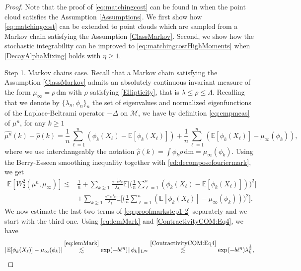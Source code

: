 \documentclass[11pt,a4paper,oneside]{amsart}
\numberwithin{equation}{section}
\newcommand{\dd}{\mathrm{d}}
\newcommand{\LL}{\mathrm{L}}
\newcommand{\m}{\mathrm{m}}
\begin{document}
\begin{proof}
Note that the proof of \eqref{eq:matchingcost} can be found in \cite[Theorem 2]{borda2021empirical} when the point cloud satisfies the Assumption \ref{Assumptions}. We first show how \eqref{eq:matchingcost} can be extended to point clouds which are sampled from a Markov chain satisfying the Assumption \ref{ClassMarkov}. Second, we show how the stochastic integrability can be improved to \eqref{eq:matchingcostHighMoments} when \eqref{DecayAlphaMixing} holds with $\eta \ge 1$.  

\medskip
{\sc Step 1. Markov chains case. }Recall that a Markov chain satisfying the Assumption \ref{ClassMarkov} admits an absolutely continuous invariant measure of the form $\mu_\infty= \rho\, \dd \m$ with $\rho$ satisfying \eqref{Ellipticity}, that is $\lambda\leq \rho\leq \Lambda$. Recalling that we denote by $\{\lambda_n,\phi_n\}_n$ the set of eigenvalues and normalized eigenfunctions of the Laplace-Beltrami operator $-\Delta$ on $\mathcal{M}$, we have by definition \eqref{eq:empmeas} of $\mu^n$, for any $k\geq 1$
%
\begin{equation}\label{ed:decomposefouriermark}
\widehat{\mu^n}(k) - \widehat{\rho}(k) = \frac1n \sum_{\ell=1}^n (\phi_k(X_\ell) - \mathbb{E}[\phi_k(X_\ell)]) + \frac1n \sum_{\ell=1}^n (\mathbb{E}[\phi_k(X_\ell)] - \mu_\infty (\phi_k)),
\end{equation}
%
where we use interchangeably the notation $\widehat{\rho}(k) = \int \phi_k \rho \,\dd \m = \mu_\infty(\phi_k)$. Using the Berry-Esseen smoothing inequality \cite[Theorem 5]{borda2021empirical} together with \eqref{ed:decomposefouriermark}, we get
%
\begin{equation}\label{eq:proofmarkstep1-2}
\begin{split}
\mathbb{E}[W_2^2(\mu^n, \mu_\infty)] \lesssim & \frac1n + \sum_{k\ge1}\frac{e^{-\frac1n\lambda_k}}{\lambda_k} \mathbb{E}\bigg[\bigg(\frac1n \sum_{\ell=1}^n (\phi_k(X_\ell) - \mathbb{E}[\phi_k(X_\ell)])\bigg)^2 \bigg] \\
& + \sum_{k\ge1}\frac{e^{-\frac1n\lambda_k}}{\lambda_k} \mathbb{E} \bigg[ \bigg( \frac1n \sum_{\ell=1}^n (\mathbb{E}[\phi_k(X_\ell)] - \mu_\infty (\phi_k)) \bigg)^2\bigg].
\end{split}
\end{equation}
%
We now estimate the last two terms of \eqref{eq:proofmarkstep1-2} separately and we start with the third one. Using \eqref{eq:lemMark} and \eqref{ContractivityCOM:Eq4}, we have 
\[
|\mathbb{E}[\phi_k(X_\ell)] - \mu_\infty(\phi_k)| \stackrel{\eqref{eq:lemMark}}{\lesssim} \exp(-b\ell^{\eta}) \|\phi_k\|_{\LL^\infty} \stackrel{\eqref{ContractivityCOM:Eq4}}{\lesssim} \exp(-b\ell^{\eta})\lambda_k^\frac12,
\]
\end{proof}
\end{document}
